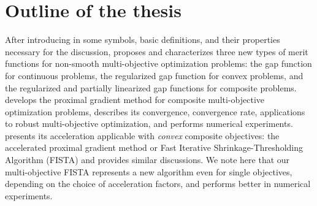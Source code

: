 \documentclass[../main]{subfiles}
\begin{document}
\section{Outline of the thesis}
After introducing in  some symbols, basic definitions, and their properties necessary for the discussion,  proposes and characterizes three new types of merit functions for non-smooth multi-objective optimization problems: the gap function for continuous problems, the regularized gap function for convex problems, and the regularized and partially linearized gap functions for composite problems.
 develops the proximal gradient method for composite multi-objective optimization problems, describes its convergence, convergence rate, applications to robust multi-objective optimization, and performs numerical experiments.
 presents its acceleration applicable with \emph{convex} composite objectives: the accelerated proximal gradient method or Fast Iterative Shrinkage-Thresholding Algorithm (FISTA) and provides similar discussions.
We note here that our multi-objective FISTA represents a new algorithm even for single objectives, depending on the choice of acceleration factors, and performs better in numerical experiments.
\end{document}

